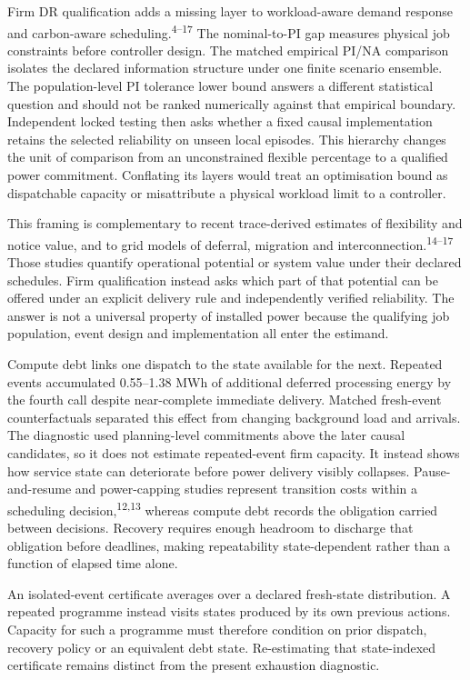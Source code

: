 \documentclass[10pt,a4paper]{article}
\begin{document}
Firm DR qualification adds a missing layer to workload-aware demand response and carbon-aware scheduling.\textsuperscript{4–17} The nominal-to-PI gap measures physical job constraints before controller design. The matched empirical PI/NA comparison isolates the declared information structure under one finite scenario ensemble. The population-level PI tolerance lower bound answers a different statistical question and should not be ranked numerically against that empirical boundary. Independent locked testing then asks whether a fixed causal implementation retains the selected reliability on unseen local episodes. This hierarchy changes the unit of comparison from an unconstrained flexible percentage to a qualified power commitment. Conflating its layers would treat an optimisation bound as dispatchable capacity or misattribute a physical workload limit to a controller.


This framing is complementary to recent trace-derived estimates of flexibility and notice value, and to grid models of deferral, migration and interconnection.\textsuperscript{14–17} Those studies quantify operational potential or system value under their declared schedules. Firm qualification instead asks which part of that potential can be offered under an explicit delivery rule and independently verified reliability. The answer is not a universal property of installed power because the qualifying job population, event design and implementation all enter the estimand.


Compute debt links one dispatch to the state available for the next. Repeated events accumulated 0.55–1.38 MWh of additional deferred processing energy by the fourth call despite near-complete immediate delivery. Matched fresh-event counterfactuals separated this effect from changing background load and arrivals. The diagnostic used planning-level commitments above the later causal candidates, so it does not estimate repeated-event firm capacity. It instead shows how service state can deteriorate before power delivery visibly collapses. Pause-and-resume and power-capping studies represent transition costs within a scheduling decision,\textsuperscript{12,13} whereas compute debt records the obligation carried between decisions. Recovery requires enough headroom to discharge that obligation before deadlines, making repeatability state-dependent rather than a function of elapsed time alone.


An isolated-event certificate averages over a declared fresh-state distribution. A repeated programme instead visits states produced by its own previous actions. Capacity for such a programme must therefore condition on prior dispatch, recovery policy or an equivalent debt state. Re-estimating that state-indexed certificate remains distinct from the present exhaustion diagnostic.
\end{document}
